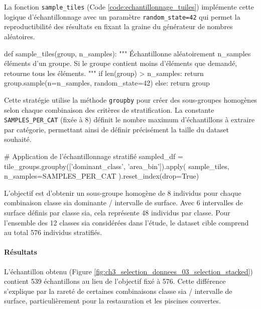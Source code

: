 La fonction \texttt{sample\_tiles} (Code \ref{code:echantillonnage_tuiles}) implémente cette logique d'échantillonnage avec un paramètre \texttt{random\_state=42} qui permet la reproductibilité des résultats en fixant la graine du générateur de nombres aléatoires.

\begin{code}[H]
    \begin{pythoncode}
    def sample_tiles(group, n_samples):
        """
        Échantillonne aléatoirement n_samples éléments d'un groupe.
        Si le groupe contient moins d'éléments que demandé, retourne tous les éléments.
        """
        if len(group) > n_samples:
            return group.sample(n=n_samples, random_state=42)
        else:
            return group
    \end{pythoncode}
    \label{code:echantillonnage_tuiles}
\end{code}

Cette stratégie utilise la méthode \texttt{groupby} pour créer des sous-groupes homogènes selon chaque combinaison des critères de stratification. La constante \texttt{SAMPLES\_PER\_CAT} (fixée à 8) définit le nombre maximum d'échantillons à extraire par catégorie, permettant ainsi de définir précisément la taille du dataset souhaité.

\begin{code}[H]
    \begin{pythoncode}
    # Application de l'échantillonnage stratifié
    sampled_df = tile_groups.groupby(['dominant_class', 'area_bin']).apply(
        sample_tiles, n_samples=SAMPLES_PER_CAT
    ).reset_index(drop=True)
    \end{pythoncode}
    \label{code:application_echantillonnage}
\end{code}

L'objectif est d'obtenir un sous-groupe homogène de 8 individus pour chaque combinaison classe \gls{sia} dominante / intervalle de surface. Avec 6 intervalles de surface définis par classe \gls{sia}, cela représente 48 individus par classe. Pour l'ensemble des 12 classes \gls{sia} considérées dans l'étude, le dataset cible comprend au total 576 individus stratifiés.

\paragraph{Résultats}
L'échantillon obtenu (Figure \ref{fig:ch3_selection_donnees_03_selection_stacked}) contient 539 échantillons au lieu de l'objectif fixé à 576. Cette différence s'explique par la rareté de certaines combinaisons classe \gls{sia} / intervalle de surface, particulièrement pour la restauration et les piscines couvertes.

